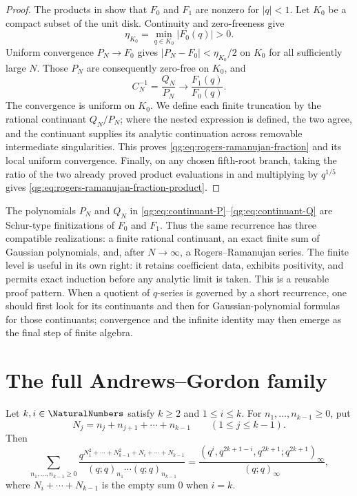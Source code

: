 \begin{proof}
The products in  show that \(F_0\) and
\(F_1\) are nonzero for \(|q|<1\).  Let \(K_0\) be a compact subset of
the unit disk.  Continuity and zero-freeness give
\[
  \eta_{K_0}=\min_{q\in K_0}|F_0(q)|>0.
\]
Uniform convergence \(P_N\to F_0\) gives
\(|P_N-F_0|<\eta_{K_0}/2\) on \(K_0\) for all sufficiently large
\(N\).  Those \(P_N\) are consequently zero-free on \(K_0\), and
\[
  C_N^{-1}=\frac{Q_N}{P_N}
  \longrightarrow\frac{F_1(q)}{F_0(q)}.
\]
The convergence is uniform on \(K_0\).  We define each finite truncation by
the rational continuant \(Q_N/P_N\); where the nested expression is defined,
the two agree, and the continuant supplies its analytic continuation across
removable intermediate singularities.  This proves
\eqref{qg:eq:rogers-ramanujan-fraction} and its local uniform convergence.
Finally, on any chosen fifth-root branch, taking the ratio of the two already
proved product evaluations in  and multiplying by
\(q^{1/5}\) gives
\eqref{qg:eq:rogers-ramanujan-fraction-product}.
\end{proof}

\begin{remark}
The polynomials \(P_N\) and \(Q_N\) in
\eqref{qg:eq:continuant-P}--\eqref{qg:eq:continuant-Q} are Schur-type
finitizations of \(F_0\) and \(F_1\).  Thus the same recurrence has three
compatible realizations: a finite rational continuant, an exact finite sum of
Gaussian polynomials, and, after \(N\to\infty\), a Rogers--Ramanujan series.
The finite level is useful in its own right: it retains coefficient data,
exhibits positivity, and permits exact induction before any analytic limit is
taken.  This is a reusable proof pattern.  When a quotient of \(q\)-series is
governed by a short recurrence, one should first look for its continuants and
then for Gaussian-polynomial formulas for those continuants; convergence and
the infinite identity may then emerge as the final step of finite algebra.
\end{remark}

\section{The full Andrews--Gordon family}
\label{qg:sec:andrews-gordon}

\begin{theorem}
\label{qg:thm-andrews-gordon}
Let \(k,i\in\NaturalNumbers\) satisfy \(k\ge2\) and \(1\le i\le k\).  For
\(n_1,\ldots,n_{k-1}\ge0\), put
\[
  N_j=n_j+n_{j+1}+\cdots+n_{k-1}
  \qquad(1\le j\le k-1).
\]
Then
\begin{equation}
 \sum_{n_1,\ldots,n_{k-1}\ge0}
 \frac{
 q^{N_1^2+\cdots+N_{k-1}^2+N_i+\cdots+N_{k-1}}}
 {(q;q)_{n_1}\cdots(q;q)_{n_{k-1}}}
 =
 \frac{(q^i,q^{2k+1-i},q^{2k+1};q^{2k+1})_\infty}
      {(q;q)_\infty},
 \label{qg:eq:andrews-gordon}
\end{equation}
where \(N_i+\cdots+N_{k-1}\) is the empty sum \(0\) when \(i=k\).
\end{theorem}

